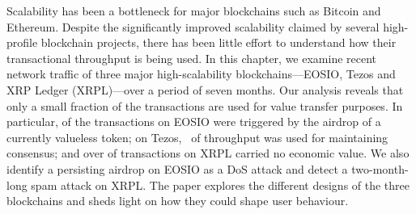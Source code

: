 Scalability has been a bottleneck for major blockchains such as Bitcoin and Ethereum.
Despite the significantly improved scalability claimed by several high-profile blockchain projects, there has been little effort to understand how their transactional throughput is being used. 
In this chapter, we examine recent network traffic of three major high-scalability blockchains---EOSIO, Tezos and XRP Ledger (XRPL)---over a period of seven months.
Our analysis reveals that only a small fraction of the transactions are used for value transfer purposes. In particular,  of the transactions on EOSIO were triggered by the airdrop of a currently valueless token; on Tezos,~ of throughput was used for maintaining consensus; and over  of transactions on XRPL carried no economic value. We also identify a persisting airdrop on EOSIO as a DoS attack and detect a two-month-long spam attack on XRPL. The paper explores the different designs of the three blockchains and sheds light on how they could shape user behaviour.
